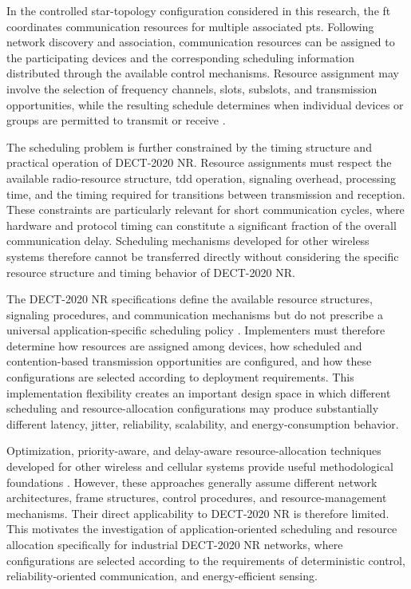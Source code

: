 \documentclass[12pt,a4paper]{article}
\begin{document}
In the controlled star-topology configuration considered in this research, the \gls{ft} coordinates communication resources for multiple associated \glspl{pt}. Following network discovery and association, communication resources can be assigned to the participating devices and the corresponding scheduling information distributed through the available control mechanisms. Resource assignment may involve the selection of frequency channels, slots, subslots, and transmission opportunities, while the resulting schedule determines when individual devices or groups are permitted to transmit or receive \cite{etsi_ts103636_3,etsi_ts103636_4}.

The scheduling problem is further constrained by the timing structure and practical operation of DECT-2020 NR. Resource assignments must respect the available radio-resource structure, \gls{tdd} operation, signaling overhead, processing time, and the timing required for transitions between transmission and reception. These constraints are particularly relevant for short communication cycles, where hardware and protocol timing can constitute a significant fraction of the overall communication delay. Scheduling mechanisms developed for other wireless systems therefore cannot be transferred directly without considering the specific resource structure and timing behavior of DECT-2020 NR.

The DECT-2020 NR specifications define the available resource structures, signaling procedures, and communication mechanisms but do not prescribe a universal application-specific scheduling policy \cite{etsi_ts103636_3,etsi_ts103636_4}. Implementers must therefore determine how resources are assigned among devices, how scheduled and contention-based transmission opportunities are configured, and how these configurations are selected according to deployment requirements. This implementation flexibility creates an important design space in which different scheduling and resource-allocation configurations may produce substantially different latency, jitter, reliability, scalability, and energy-consumption behavior.

Optimization, priority-aware, and delay-aware resource-allocation techniques developed for other wireless and cellular systems provide useful methodological foundations \cite{andrewsProvidingQualityService2001,liuEfficientResourceAllocation2024,bahetiPriorityawareRadioResource2026nr1}. However, these approaches generally assume different network architectures, frame structures, control procedures, and resource-management mechanisms. Their direct applicability to DECT-2020 NR is therefore limited. This motivates the investigation of application-oriented scheduling and resource allocation specifically for industrial DECT-2020 NR networks, where configurations are selected according to the requirements of deterministic control, reliability-oriented communication, and energy-efficient sensing.
\end{document}
